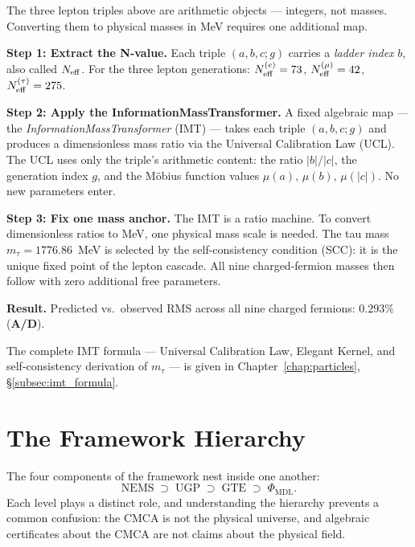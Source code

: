 \documentclass[11pt,openany]{book}
\theoremstyle{remark}
\newcommand{\UGP}{\text{UGP}}
\newcommand{\GTE}{\text{GTE}}
\newcommand{\NEMS}{\text{NEMS}}
\newcommand{\PHIMDL}{\Phi_{\mathrm{MDL}}}
\newcommand{\CatAD}{\textbf{A/D}}
\begin{document}
\begin{tcolorbox}[colback=green!5,colframe=green!50!black,
  title={How to Generate Masses from GTE Triples}]
The three lepton triples above are arithmetic objects --- integers, not masses.
Converting them to physical masses in MeV requires one additional map.

\medskip
\noindent\textbf{Step 1: Extract the N-value.}
Each triple $(a,b,c;g)$ carries a \emph{ladder index} $b$, also called $N_{\rm eff}$.
For the three lepton generations: $N_{\rm eff}^{(e)} = 73$, $N_{\rm eff}^{(\mu)} = 42$,
$N_{\rm eff}^{(\tau)} = 275$.

\medskip
\noindent\textbf{Step 2: Apply the InformationMassTransformer.}
A fixed algebraic map --- the \emph{InformationMassTransformer} (IMT) --- takes each
triple $(a,b,c;g)$ and produces a dimensionless mass ratio via the Universal Calibration
Law (UCL).  The UCL uses only the triple's arithmetic content: the ratio $|b|/|c|$, the
generation index $g$, and the M\"{o}bius function values $\mu(a),\,\mu(b),\,\mu(|c|)$.
No new parameters enter.

\medskip
\noindent\textbf{Step 3: Fix one mass anchor.}
The IMT is a ratio machine.  To convert dimensionless ratios to MeV, one physical mass
scale is needed.  The tau mass $m_\tau = 1776.86$~MeV is selected by the
self-consistency condition (SCC): it is the unique fixed point of the lepton cascade.
All nine charged-fermion masses then follow with zero additional free parameters.

\medskip
\noindent\textbf{Result.} Predicted vs.\ observed RMS across all nine charged fermions:
$0.293\%$ (\CatAD).

\medskip
The complete IMT formula --- Universal Calibration Law, Elegant Kernel, and
self-consistency derivation of $m_\tau$ --- is given in
Chapter~\ref{chap:particles}, \S\ref{subsec:imt_formula}.
\end{tcolorbox}

\section{The Framework Hierarchy}
\label{sec:hierarchy}

The four components of the framework nest inside one another:
\[
  \NEMS \;\supset\; \UGP \;\supset\; \GTE \;\supset\; \PHIMDL.
\]
Each level plays a distinct role, and understanding the hierarchy prevents a common
confusion: the CMCA is not the physical universe, and algebraic certificates about the
CMCA are not claims about the physical field.
\end{document}
